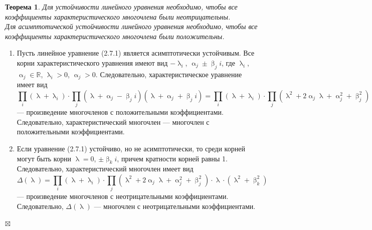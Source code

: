 \documentclass[a4paper, 12pt]{report}
\newenvironment{Proof} %
{\par\noindent{$\blacklozenge$}} %
{\hfill$\scriptstyle\boxtimes$}
\newcommand{\Rm}{\mathbb{R}}
\renewcommand{\alpha}{\upalpha}
\renewcommand{\beta}{\upbeta}
\renewcommand{\lambda}{\uplambda}
\newtheorem*{theorem}{Теорема}
\begin{document}
\begin{theorem}
	Для устойчивости линейного уравнения необходимо, чтобы все коэффициенты характеристического многочлена были неотрицательны.\\
	Для асимптотической устойчивости линейного уравнения необходимо, чтобы все коэффициенты характеристического многочлена были положительны.
\end{theorem}\begin{Proof}\begin{enumerate}
	\item Пусть линейное уравнение (2.7.1) является асимптотически устойчивым. Все корни характеристического уравнения имеют вид $-\lambda_i$, $\alpha_j \pm \beta_j i$, где $\lambda_i$, $\alpha_j \in \Rm$, $\lambda_i > 0$, $\alpha_j > 0$. Следовательно, характеристическое уравнение имеет вид
	$$\prod_i (\lambda + \lambda_i)\cdot \prod_j(\lambda + \alpha_j - \beta_ji)(\lambda + \alpha_j + \beta_ji) = \prod_i (\lambda + \lambda_i)\cdot \prod_j(\lambda^2 + 2\alpha_j\lambda + \alpha_j^2 + \beta_j^2)$$
	--- произведение многочленов с положительными коэффициентами. Следовательно, характеристический многочлен --- многочлен с положительными коэффициентами.
	\item Если уравнение (2.7.1) устойчиво, но не асимптотически, то среди корней могут быть корни $\lambda = 0$, $\pm \beta_k i$, причем кратности корней равны 1. Следовательно, характеристический многочлен имеет вид $$\Delta(\lambda) = \prod_i (\lambda + \lambda_i)\cdot \prod_j(\lambda^2 + 2\alpha_j\lambda + \alpha_j^2 + \beta_j^2)\cdot\lambda\cdot(\lambda^2 + \beta_k^2)$$
	--- произведение многочленов с неотрицательными коэффициентами. Следовательно, $\Delta(\lambda)$ --- многочлен с неотрицательными коэффициентами.
\end{enumerate}
\end{Proof}
\end{document}
